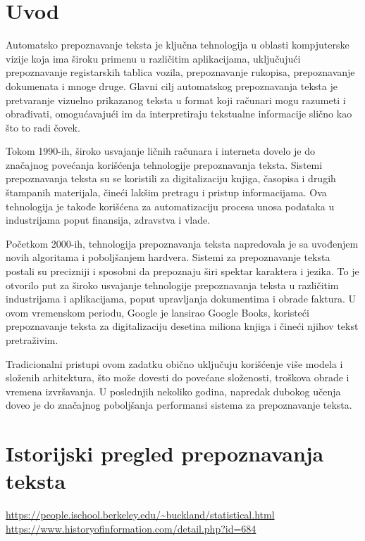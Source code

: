 \documentclass[a4paper,12pt,titlepage]{article}
\begin{document}
	\section{Uvod}
	Automatsko prepoznavanje teksta je ključna tehnologija u oblasti kompjuterske vizije koja ima široku primenu u različitim aplikacijama, uključujući prepoznavanje registarskih tablica vozila, prepoznavanje rukopisa, prepoznavanje dokumenata i mnoge druge. Glavni cilj automatskog prepoznavanja teksta je pretvaranje vizuelno prikazanog teksta u format koji računari mogu razumeti i obrađivati, omogućavajući im da interpretiraju tekstualne informacije slično kao što to radi čovek.
	\newline
	
	Tokom 1990-ih, široko usvajanje ličnih računara i interneta dovelo je do značajnog povećanja korišćenja tehnologije prepoznavanja teksta. Sistemi prepoznavanja teksta su se koristili za digitalizaciju knjiga, časopisa i drugih štampanih materijala, čineći lakšim pretragu i pristup informacijama. Ova tehnologija je takođe korišćena za automatizaciju procesa unosa podataka u industrijama poput finansija, zdravstva i vlade.
	
	Početkom 2000-ih, tehnologija prepoznavanja teksta napredovala je sa uvođenjem novih algoritama i poboljšanjem hardvera. Sistemi za prepoznavanje teksta postali su precizniji i sposobni da prepoznaju širi spektar karaktera i jezika. To je otvorilo put za široko usvajanje tehnologije prepoznavanja teksta u različitim industrijama i aplikacijama, poput upravljanja dokumentima i obrade faktura. U ovom vremenskom periodu, Google je lansirao Google Books, koristeći prepoznavanje teksta za digitalizaciju desetina miliona knjiga i čineći njihov tekst pretraživim.
	\newline
	
	Tradicionalni pristupi ovom zadatku obično uključuju korišćenje više modela i složenih arhitektura, što može dovesti do povećane složenosti, troškova obrade i vremena izvršavanja. U poslednjih nekoliko godina, napredak dubokog učenja doveo je do značajnog poboljšanja performansi sistema za prepoznavanje teksta.
	\newpage
	
	\section{Istorijski pregled prepoznavanja teksta}
	\url{https://people.ischool.berkeley.edu/~buckland/statistical.html}
	\newline
	\url{https://www.historyofinformation.com/detail.php?id=684}
\end{document}
